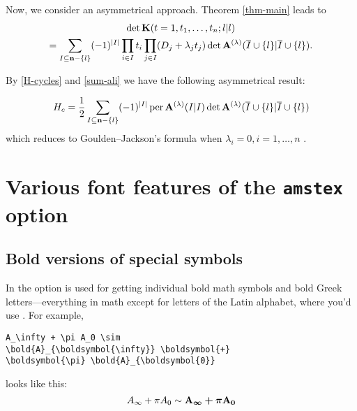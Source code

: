 Now, we consider an asymmetrical approach. Theorem \ref{thm-main} leads to
\begin{multline}
\det\bold K(t=1,t_1,\dots,t_n;l |l )\\
=\sum_{I\subseteq\bold n-\{l \}}
(-1)^{|I|}\prod_{i\in I}t_i\prod_{j\in I}
(D_j+\lambda_jt_j)\det\bold A^{(\lambda)}
(\overline I\cup\{l \}|\overline I\cup\{l \}).
\end{multline}

By \eqref{H-cycles} and \eqref{sum-ali} we have the following asymmetrical
result:
\begin{thm}\label{thm-asym}
\begin{equation}
H_c=\frac12\sum_{I\subseteq\bold n-\{l \}}
(-1)^{|I|}\operatorname{per}\bold A^{(\lambda)}(I|I)\det
\bold A^{(\lambda)}
(\overline I\cup\{l \}|\overline I\cup\{l \})
\end{equation}
which reduces to Goulden--Jackson's formula when $\lambda_i=0,i=1,\dots,n$
\cite{mami:matrixth}.
\end{thm}

\section{Various font features of the {\tt amstex} option}
\label{s:font}
\subsection{Bold versions of special symbols}

In the  option  is used for getting
individual bold math symbols and bold Greek letters---everything in
math except for letters of the Latin alphabet, 
where you'd use .  For example,
\begin{verbatim} 
A_\infty + \pi A_0 \sim 
\bold{A}_{\boldsymbol{\infty}} \boldsymbol{+} 
\boldsymbol{\pi} \bold{A}_{\boldsymbol{0}}
\end{verbatim}
looks like this: 
\[A_\infty + \pi A_0 \sim \bold{A}_{\boldsymbol{\infty}} 
\boldsymbol{+} \boldsymbol{\pi} \bold{A}_{\boldsymbol{0}}\]

